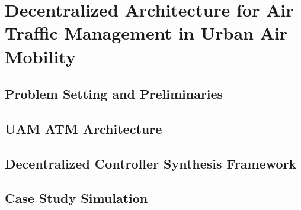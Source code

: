








%




\chapter{Decentralized Architecture for Air Traffic Management in Urban Air Mobility}


\section {Problem Setting and Preliminaries}

%
\section{UAM ATM Architecture} \label{sec:Motivation}




\section{Decentralized Controller Synthesis Framework}\label{sec:distshield}

%
%
\section{Case Study Simulation}\label{sec:experiments}



